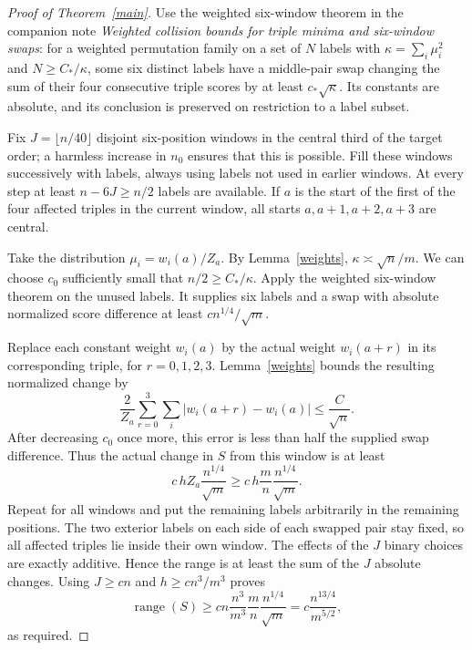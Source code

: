\documentclass[11pt]{article}
\begin{document}
\begin{proof}[Proof of Theorem~\ref{main}]
Use the weighted six-window theorem in the companion note
\emph{Weighted collision bounds for triple minima and six-window
swaps}: for a weighted permutation family on a set of $N$ labels with
$\kappa=\sum_i\mu_i^2$ and $N\ge C_*/\kappa$, some six distinct
labels have a middle-pair swap changing the sum of their four consecutive
triple scores by at least $c_*\sqrt\kappa$. Its constants are absolute,
and its conclusion is preserved on restriction to a label subset.

Fix $J=\lfloor n/40\rfloor$ disjoint six-position windows in the central
third of the target order; a harmless increase in $n_0$ ensures that
this is possible. Fill these windows successively with labels, always
using labels not used in earlier windows. At every step at least
$n-6J\ge n/2$ labels are available. If $a$ is the start of the first
of the four affected triples in the current window, all starts
$a,a+1,a+2,a+3$ are central.

Take the distribution $\mu_i=w_i(a)/Z_a$. By Lemma~\ref{weights},
$\kappa\asymp\sqrt n/m$. We can choose $c_0$ sufficiently small that
$n/2\ge C_*/\kappa$. Apply the weighted six-window theorem on the
unused labels. It supplies six labels and a swap with absolute
normalized score difference at least
$c n^{1/4}/\sqrt m$.

Replace each constant weight
$w_i(a)$ by the actual weight $w_i(a+r)$ in its corresponding triple,
for $r=0,1,2,3$. Lemma~\ref{weights} bounds the resulting normalized
change by
\[
 \frac2{Z_a}\sum_{r=0}^3\sum_i|w_i(a+r)-w_i(a)|
       \le \frac C{\sqrt n}.
\]
After decreasing $c_0$ once more, this error is less than half the
supplied swap difference. Thus the actual change in $S$ from this window
is at least
\[
 c\,h Z_a\frac{n^{1/4}}{\sqrt m}
 \ge c\,h\frac mn\frac{n^{1/4}}{\sqrt m}.
\]
Repeat for all windows and put the remaining labels arbitrarily in the
remaining positions. The two exterior labels on each side of each
swapped pair stay fixed, so all affected triples lie inside their
own window. The effects of the $J$ binary choices are exactly additive.
Hence the range is at least the sum of the $J$ absolute changes.
Using $J\ge cn$ and $h\ge c n^3/m^3$ proves
\[
 \operatorname{range}(S)
 \ge c n\frac{n^3}{m^3}\frac mn\frac{n^{1/4}}{\sqrt m}
 =c\frac{n^{13/4}}{m^{5/2}},
\]
as required.
\end{proof}
\end{document}
